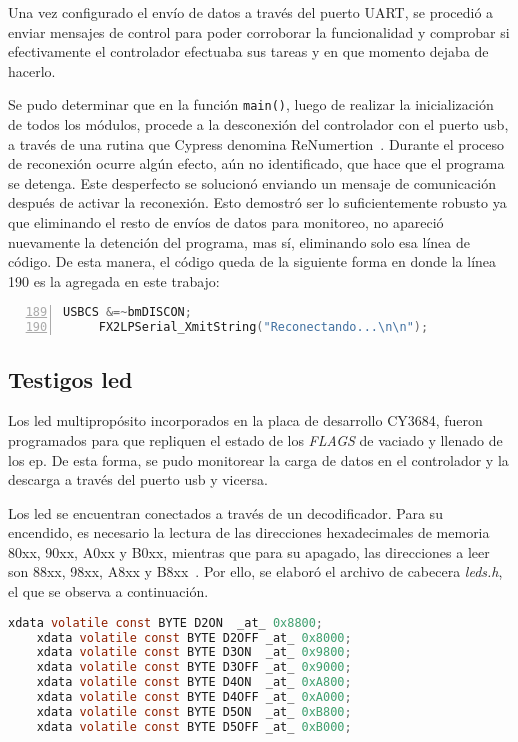 Una vez configurado el envío de datos a través del puerto UART, se procedió a enviar mensajes de control para poder corroborar la funcionalidad y comprobar si efectivamente el controlador efectuaba sus tareas y en que momento dejaba de hacerlo.

Se pudo determinar que en la función \verb|main()|, luego de realizar la inicialización de todos los módulos, procede a la desconexión del controlador con el puerto \acrshort{usb}, a través de una rutina que Cypress denomina ReNumertion~\cite{CypressSemiconductor2014fx2lp}. Durante el proceso de reconexión ocurre algún efecto, aún no identificado, que hace que el programa se detenga. Este desperfecto se solucionó enviando un mensaje de comunicación después de activar la reconexión. Esto demostró ser lo suficientemente robusto ya que eliminando el resto de envíos de datos para monitoreo, no apareció nuevamente la detención del programa, mas sí, eliminando solo esa línea de código. De esta manera, el código queda de la siguiente forma en donde la línea 190 es la agregada en este trabajo:

\begin{lstlisting}[language=C,backgroundcolor=\color{gray!30},numbers=left,firstnumber=189,basicstyle=\footnotesize]
	 USBCS &=~bmDISCON;
	 FX2LPSerial_XmitString("Reconectando...\n\n");
\end{lstlisting}

\subsection{Testigos \acrshort{led}}
Los \acrshort{led} multipropósito incorporados en la placa de desarrollo CY3684, fueron programados para que repliquen el estado de los \textit{FLAGS} de vaciado y llenado de los \acrshort{ep}. De esta forma, se pudo monitorear la carga de datos en el controlador y la descarga a través del puerto \acrshort{usb} y vicersa.

Los \acrshort{led} se encuentran conectados a través de un decodificador. Para su encendido, es necesario la lectura de las direcciones hexadecimales de memoria 80xx, 90xx, A0xx y B0xx, mientras que para su apagado, las direcciones a leer son  88xx, 98xx, A8xx y B8xx~\cite{CypressSemiconductor2014cy3684}. Por ello, se elaboró el archivo de cabecera {\it leds.h}, el que se observa a continuación.
	
	\begin{lstlisting}[language=C,backgroundcolor=\color{gray!30}]
	xdata volatile const BYTE D2ON	_at_ 0x8800;
	xdata volatile const BYTE D2OFF	_at_ 0x8000;
	xdata volatile const BYTE D3ON	_at_ 0x9800;
	xdata volatile const BYTE D3OFF	_at_ 0x9000;
	xdata volatile const BYTE D4ON	_at_ 0xA800;
	xdata volatile const BYTE D4OFF	_at_ 0xA000;
	xdata volatile const BYTE D5ON	_at_ 0xB800;
	xdata volatile const BYTE D5OFF	_at_ 0xB000;	\end{lstlisting}
	
